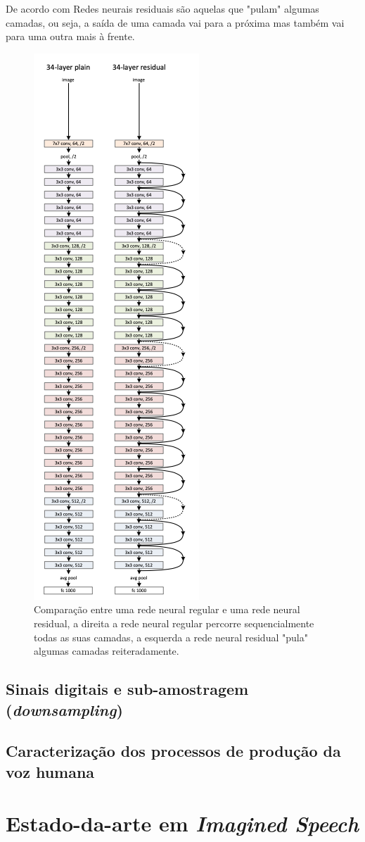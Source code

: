 		\par De acordo com \cite{DBLP:journals/corr/HeZRS15} Redes neurais residuais são aquelas que "pulam" algumas camadas, ou seja, a saída de uma camada vai para a próxima mas também vai para uma outra mais à frente. 
		\begin{figure}
			\centering
			\includegraphics[width=0.3\linewidth]{images/ResidualLearnningNNAndRegularNN}
			\caption[Comparação entre uma rede neural regular e uma rede neural residual]{Comparação entre uma rede neural regular e uma rede neural residual, a direita a rede neural regular percorre sequencialmente todas as suas camadas, a esquerda a rede neural residual "pula" algumas camadas reiteradamente.}
			\label{fig:residuallearnningnnandregularnn}
		\end{figure}
		
		
		
		\subsection{Sinais digitais e sub-amostragem (\textit{downsampling})}
			
		\subsection{Caracterização dos processos de produção da voz humana}
		
	\section{Estado-da-arte em \textit{Imagined Speech}}